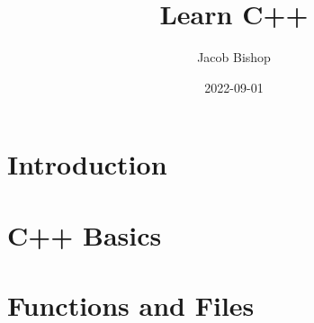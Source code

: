 \documentclass[UTF8]{ctexart}
\title{Learn C++}
\author{Jacob Bishop}
\date{2022-09-01}
\begin{document}
\maketitle

\section{Introduction}






\newpage

\section{C++ Basics}

% 
% 
% 
% 
% 
% 
% 

\newpage

\section{Functions and Files}

% 
% 
% 
\end{document}
